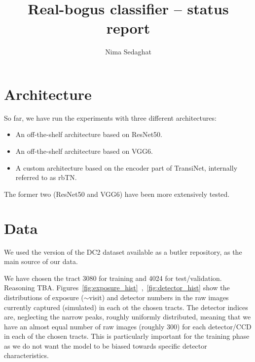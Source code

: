 \documentclass[DM,authoryear,toc]{lsstdoc}
\title{Real-bogus classifier -- status report}
\author{%
Nima Sedaghat
}
\date{\vcsDate}
\begin{document}
\maketitle


\section{Architecture}
So far, we have run the experiments with three different architectures:

\begin{itemize}
\item{An off-the-shelf architecture based on ResNet50.}
\item{An off-the-shelf architecture based on VGG6.}
\item{A custom architecture based on the encoder part of TransiNet, internally referred to as rbTN}.
\end{itemize}

The former two (ResNet50 and VGG6) have been more extensively tested.

\section{Data}
We used the version of the DC2 dataset available as a butler repository, as the main source of our data.

We have chosen the tract 3080 for training and 4024 for test/validation. Reasoning TBA.
Figures~\ref{fig:exposure_hist}~,~\ref{fig:detector_hist} show the distributions of exposure ($\sim$visit) and detector numbers in the raw images currently captured (simulated) in each ot the chosen tracts. The detector indices are, neglecting the narrow peaks, roughly uniformly distributed, meaning that we have an almost equal number of raw images (roughly 300) for each detector/CCD in each of the chosen tracts. This is particularly important for the training phase as we do not want the model to be biased towards specific detector characteristics.
\end{document}
